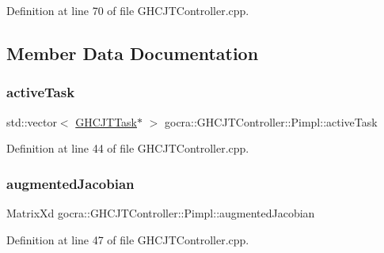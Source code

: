 Definition at line 70 of file G\+H\+C\+J\+T\+Controller.\+cpp.



\subsection{Member Data Documentation}
\hypertarget{structgocra_1_1GHCJTController_1_1Pimpl_a2322f7612c4ee994869b897d6546da97}{}\label{structgocra_1_1GHCJTController_1_1Pimpl_a2322f7612c4ee994869b897d6546da97} 
\subsubsection{\texorpdfstring{active\+Task}{activeTask}}
{\footnotesize\ttfamily std\+::vector$<$ \hyperlink{classgocra_1_1GHCJTTask}{G\+H\+C\+J\+T\+Task}$\ast$ $>$ gocra\+::\+G\+H\+C\+J\+T\+Controller\+::\+Pimpl\+::active\+Task}



Definition at line 44 of file G\+H\+C\+J\+T\+Controller.\+cpp.

\hypertarget{structgocra_1_1GHCJTController_1_1Pimpl_a9ebc2b951dfa979568dfe12a36124424}{}\label{structgocra_1_1GHCJTController_1_1Pimpl_a9ebc2b951dfa979568dfe12a36124424} 
\subsubsection{\texorpdfstring{augmented\+Jacobian}{augmentedJacobian}}
{\footnotesize\ttfamily Matrix\+Xd gocra\+::\+G\+H\+C\+J\+T\+Controller\+::\+Pimpl\+::augmented\+Jacobian}



Definition at line 47 of file G\+H\+C\+J\+T\+Controller.\+cpp.

\hypertarget{structgocra_1_1GHCJTController_1_1Pimpl_ae336064c9007227c37ec24f455b4cc39}{}\label{structgocra_1_1GHCJTController_1_1Pimpl_ae336064c9007227c37ec24f455b4cc39} 
